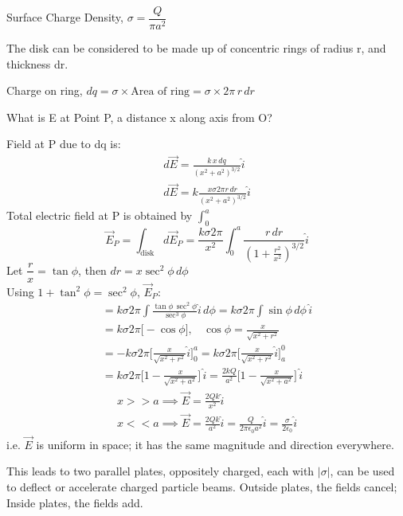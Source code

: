 \documentclass[a4paper, 11pt, fleqn, normalem]{report}
\begin{document}
Surface Charge Density, $\sigma = \dfrac{Q}{\pi a^{2}}$

The disk can be considered to be made up of concentric rings of radius r, and thickness dr.

Charge on ring, $dq = \sigma \times \text{Area of ring} = \sigma \times 2\pi \, r \, dr$

What is E at Point P, a distance x along axis from O?

Field at P due to dq is:
\begin{gather*}
    d\vec{E} = \frac{k \, x \, dq}{(x^{2} + a^{2})^{3/2}} \hat{i} \\
    d\vec{E} = k \frac{x \sigma 2\pi r \, dr}{(x^{2} + a^{2})^{3/2}} \hat{i}
\end{gather*}
Total electric field at P is obtained by $\int_{0}^{a}$
\begin{equation*}
    \vec{E}_{P} = \int_{\text{disk}} d\vec{E}_{P} = \frac{k \sigma 2\pi}{x^{2}} \int_{0}^{a} \frac{r \, dr}{(1 + \tfrac{r^{2}}{x^{2}})^{3/2}} \hat{i}
\end{equation*}
Let $\dfrac{r}{x} = \tan\phi$, then $dr = x\sec^{2}\phi \, d\phi$ \\
Using $1 + \tan^{2}\phi = \sec^{2}\phi$, $\vec{E}_{P}$:
\begin{gather*}
    = k \sigma 2\pi \int \frac{\tan\phi \, \sec^{2}\phi}{\sec^{3}\phi} \hat{i} \, d\phi = k \sigma 2\pi \int \sin\phi \, d\phi \, \hat{i} \\
    = k \sigma 2\pi \big[-\cos\phi \big], ~~~~ \cos\phi = \frac{x}{\sqrt{x^{2} + r^{2}}} \\
    = -k \sigma 2\pi \Big[\frac{x}{\sqrt{x^{2} + r^{2}}} \hat{i} \Big]_{0}^{a} = k \sigma 2\pi \Big[\frac{x}{\sqrt{x^{2} + r^{2}}} \hat{i} \Big]_{a}^{0} \\
    = k \sigma 2\pi \Big[1 - \frac{x}{\sqrt{x^{2} + a^{2}}} \Big] \, \hat{i} = \frac{2 k Q}{a^{2}} \Big[1 - \frac{x}{\sqrt{x^{2} + a^{2}}} \Big] \, \hat{i}
\end{gather*}
\begin{gather*}
    x >> a \implies \vec{E} = \frac{2Qk}{x^{2}} \hat{i} \\
    x << a \implies \vec{E} = \frac{2Qk}{a^{2}} \hat{i} = \frac{Q}{2\pi \epsilon_{0} a^{2}} \hat{i} = \frac{\sigma}{2\epsilon_{0}} \hat{i}
\end{gather*}
i.e. $\vec{E}$ is uniform in space; it has the same magnitude and direction everywhere.

This leads to two parallel plates, oppositely charged, each with $|\sigma|$, can be used to deflect or accelerate charged particle beams.
Outside plates, the fields cancel; Inside plates, the fields add.
\end{document}

